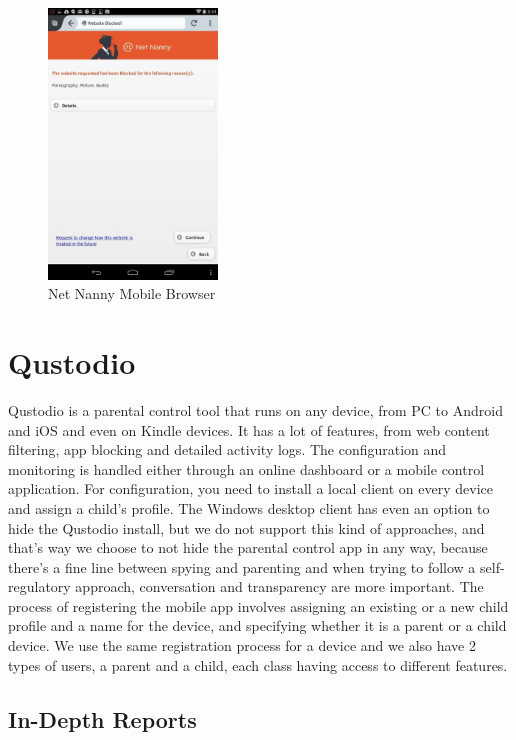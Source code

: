 \begin{figure}[th]
\centering
\includegraphics[width=0.4\textwidth]{Figures/netnanny-site-blocked}
\decoRule
\caption{Net Nanny Mobile Browser}
\label{fig:netnanny-site-blocked}
\end{figure}

\section{Qustodio}

Qustodio \citep{qustodio} is a parental control tool that runs on any device, from PC to Android and iOS and even on Kindle devices. It has a lot of features, from web content filtering, app blocking and detailed activity logs. The configuration and monitoring is handled either through an online dashboard or a mobile control application. For configuration, you need to install a local client on every device and assign a child's profile. The Windows desktop client has even an option to hide the Qustodio install, but we do not support this kind of approaches, and that's way we choose to not hide the parental control app in any way, because there's a fine line between spying and parenting and when trying to follow a self-regulatory approach, conversation and transparency are more important. The process of registering the mobile app involves assigning an existing or a new child profile and a name for the device, and specifying whether it is a parent or a child device. We use the same registration process for a device and we also have 2 types of users, a parent and a child, each class having access to different features. \parencite{qustodioPCMag}

\subsection{In-Depth Reports}

